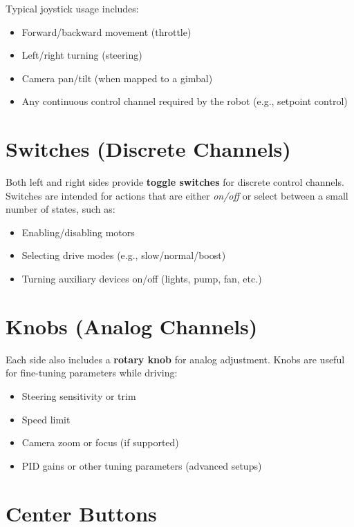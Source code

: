 Typical joystick usage includes:

\begin{itemize}
    \item Forward/backward movement (throttle)
    \item Left/right turning (steering)
    \item Camera pan/tilt (when mapped to a gimbal)
    \item Any continuous control channel required by the robot (e.g., setpoint control)
\end{itemize}

\section{Switches (Discrete Channels)}
\label{sec:switches}

Both left and right sides provide \textbf{toggle switches} for discrete control channels. Switches are intended for actions that are either \textit{on/off} or select between a small number of states, such as:

\begin{itemize}
    \item Enabling/disabling motors
    \item Selecting drive modes (e.g., slow/normal/boost)
    \item Turning auxiliary devices on/off (lights, pump, fan, etc.)
\end{itemize}

\section{Knobs (Analog Channels)}
\label{sec:knobs}

Each side also includes a \textbf{rotary knob} for analog adjustment. Knobs are useful for fine-tuning parameters while driving:

\begin{itemize}
    \item Steering sensitivity or trim
    \item Speed limit
    \item Camera zoom or focus (if supported)
    \item PID gains or other tuning parameters (advanced setups)
\end{itemize}

\section{Center Buttons}
\label{sec:center-buttons}

